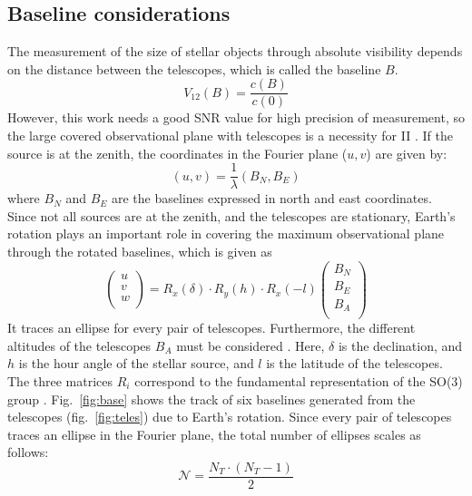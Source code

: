 \subsection{Baseline considerations}
The measurement of the size of stellar objects through absolute visibility depends on the distance between the telescopes, which is called the baseline $B$. 
\begin{equation}
	V_{12}(B) = \frac{c(B)}{c(0)}
	\label{eq:angular_size_meas}
\end{equation}
However, this work needs a good SNR value for high precision of measurement, so the large covered observational plane with telescopes is a necessity for II \citep{acciari2020optical, abeysekara2020demonstration}. If the source is at the zenith, the coordinates in the Fourier plane ($u,v$) are given by:
\begin{equation}
	(u,v) = \frac{1}{\lambda} (B_N, B_E)
\end{equation}
where $B_N$ and $B_E$ are the baselines expressed in north and east coordinates. Since not all sources are at the zenith, and the telescopes are stationary, Earth's rotation plays an important role in covering the maximum observational plane through the rotated baselines, which is given as  
\begin{equation}
	\begin{pmatrix} u\\ v\\ w\\ \end{pmatrix} = R_x(\delta) \cdot R_y(h) \cdot R_x(-l) \begin{pmatrix} B_N\\ B_E\\ B_A\\ \end{pmatrix}
	\label{eq:baseline_rot}
\end{equation}
It traces an ellipse for every pair of telescopes. Furthermore, the different altitudes of the telescopes $B_A$ must be considered \citep{dravins2013optical, saha2020theory}. Here, $\delta$ is the declination, and $h$ is the hour angle of the stellar source, and $l$ is the latitude of the telescopes. The three matrices $R_i$ correspond to the fundamental representation of the SO(3) group \citep{saha2020theory}. Fig.~\ref{fig:base} shows the track of six baselines generated from the telescopes (fig.~\ref{fig:teles}) due to Earth's rotation. Since every pair of telescopes traces an ellipse in the Fourier plane, the total number of ellipses scales as follows:
\begin{equation}
	\label{eq:N_telescopes}
	\mathcal{N} = \frac{N_T \cdot (N_T -1)}{2}
\end{equation}


